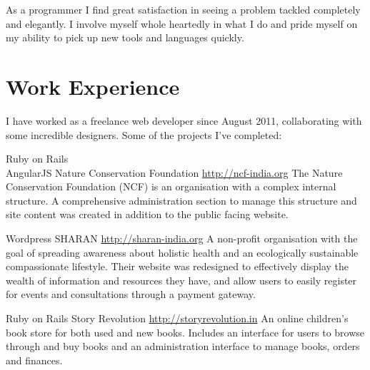 \documentclass[11pt,a4paper,sans]{moderncv}        %
\begin{document}
\makecvtitle

\small{As a programmer I find great satisfaction in seeing a problem tackled completely and elegantly. I involve myself whole heartedly in what I do and pride myself on my ability to pick up new tools and languages quickly.}

\vspace{6pt}

\section{Work Experience}

\vspace{6pt}

\small{I have worked as a freelance web developer since August 2011, collaborating with some incredible designers. Some of the projects I've completed:}

\vspace{12pt}

\cventry
{\textcolor{light}{Ruby on Rails \\AngularJS}}
{Nature Conservation Foundation}
{}
{\href{http://ncf-india.org}{\textcolor{linkcolour}{http://ncf-india.org}}}{}
{The Nature Conservation Foundation (NCF) is an organisation with a complex internal structure. A comprehensive administration section to manage this structure and site content was created in addition to the public facing website.}

\vspace{8pt}

\cventry
{\textcolor{light}{Wordpress}}
{SHARAN}
{}
{\href{http://sharan-india.org}{\textcolor{linkcolour}{http://sharan-india.org}}}{}
{A non-profit organisation with the goal of spreading awareness about holistic health and an ecologically sustainable compassionate lifestyle. Their website was redesigned to effectively display the wealth of information and resources they have, and allow users to easily register for events and consultations through a payment gateway.}


\vspace{8pt}

\cventry
{\textcolor{light}{Ruby on Rails}}
{Story Revolution}
{}
{\href{http://storyrevolution.in}{\textcolor{linkcolour}{http://storyrevolution.in}}}{}
{An online children's book store for both used and new books. Includes an interface for users to browse through and buy books and an administration interface to manage books, orders and finances.}
\end{document}
